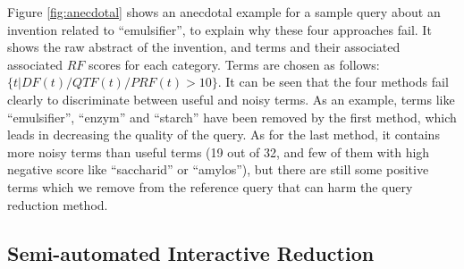 \vspace*{0.5mm}
Figure \ref{fig:anecdotal} shows an anecdotal example for a sample query about an invention related to ``emulsifier'', to explain why these four approaches fail. It shows the raw abstract of the invention, and terms and their associated associated $\mathit{RF}$ scores for each category. Terms are chosen as follows: $\{t| DF(t)/QTF(t)/PRF(t)>10\} $. It can be seen that the four methods fail clearly to discriminate between useful and noisy terms. As an example, terms like ``emulsifier'', ``enzym'' and ``starch'' have been removed by the first method, which leads in decreasing the quality of the query. As for the last method, it contains more noisy terms than useful terms (19 out of 32, and few of them with high negative score like ``saccharid'' or ``amylos''), but there are still some positive terms which we remove from the reference query that can harm the query reduction method.
 


\subsection{Semi-automated Interactive Reduction}

\label{sec:SemiAutomatedInteractiveReduction}


